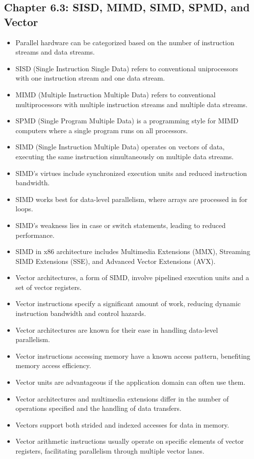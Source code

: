 \documentclass[12pt]{article}
\begin{document}
\subsection*{Chapter 6.3: SISD, MIMD, SIMD, SPMD, and Vector}
\begin{itemize}
    \item Parallel hardware can be categorized based on the number of instruction streams and data streams.
    \item SISD (Single Instruction Single Data) refers to conventional uniprocessors with one instruction stream and one data stream.
    \item MIMD (Multiple Instruction Multiple Data) refers to conventional multiprocessors with multiple instruction streams and multiple data streams.
    \item SPMD (Single Program Multiple Data) is a programming style for MIMD computers where a single program runs on all processors.
    \item SIMD (Single Instruction Multiple Data) operates on vectors of data, executing the same instruction simultaneously on multiple data streams.
    \item SIMD's virtues include synchronized execution units and reduced instruction bandwidth.
    \item SIMD works best for data-level parallelism, where arrays are processed in for loops.
    \item SIMD's weakness lies in case or switch statements, leading to reduced performance.
    \item SIMD in x86 architecture includes Multimedia Extensions (MMX), Streaming SIMD Extensions (SSE), and Advanced Vector Extensions (AVX).
    \item Vector architectures, a form of SIMD, involve pipelined execution units and a set of vector registers.
    \item Vector instructions specify a significant amount of work, reducing dynamic instruction bandwidth and control hazards.
    \item Vector architectures are known for their ease in handling data-level parallelism.
    \item Vector instructions accessing memory have a known access pattern, benefiting memory access efficiency.
    \item Vector units are advantageous if the application domain can often use them.
    \item Vector architectures and multimedia extensions differ in the number of operations specified and the handling of data transfers.
    \item Vectors support both strided and indexed accesses for data in memory.
    \item Vector arithmetic instructions usually operate on specific elements of vector registers, facilitating parallelism through multiple vector lanes.
\end{itemize}
\end{document}
